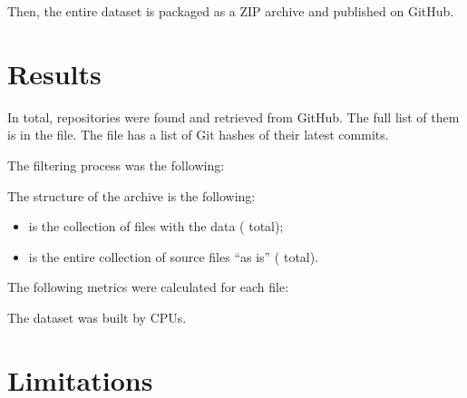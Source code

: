 \documentclass[11pt,sigplan,nonacm]{acmart}
\begin{document}
Then, the entire dataset is packaged as a ZIP archive and published
on GitHub.

\section{Results}

In total, \unskip{} repositories
were found and retrieved from GitHub.
The full list of them is in the  file.
The  file has a list of Git hashes of their latest commits.

The filtering process was the following:

\begin{enumerate}
\unskip{}
\end{enumerate}

The structure of the archive is the following:

\begin{itemize}

  \item {} is the collection of  files with the data
  (\unskip{} total);

  \item {} is the entire collection of
  \unskip{}
  source files ``as is''
  (\unskip{} total).

\end{itemize}

The following \unskip{} metrics were
calculated for each  file:

\begin{itemize}
  
\end{itemize}

The dataset was built by
\unskip{}
CPUs\unskip{}.

\section{Limitations}
\end{document}
